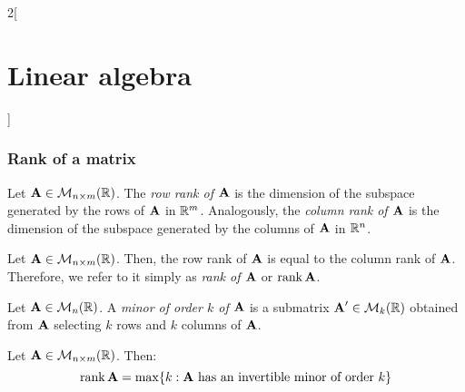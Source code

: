 \documentclass[../../../main.tex]{subfiles}
\begin{document}
\begin{multicols}{2}[\section{Linear algebra}]
    \subsubsection*{Rank of a matrix}
    \begin{definition}
        Let $\boldsymbol{\mathrm{A}}\in\mathcal{M}_{n\times m}(\mathbb{R})$. The \textit{row rank of $\boldsymbol{\mathrm{A}}$} is the dimension of the subspace generated by the rows of $\boldsymbol{\mathrm{A}}$ in $\mathbb{R}^m$. Analogously, the \textit{column rank of $\boldsymbol{\mathrm{A}}$} is the dimension of the subspace generated by the columns of $\boldsymbol{\mathrm{A}}$ in $\mathbb{R}^n$.
    \end{definition}
    \begin{prop}
        Let $\boldsymbol{\mathrm{A}}\in\mathcal{M}_{n\times m}(\mathbb{R})$. Then, the row rank of $\boldsymbol{\mathrm{A}}$ is equal to the column rank of $\boldsymbol{\mathrm{A}}$. Therefore, we refer to it simply as \textit{rank of $\boldsymbol{\mathrm{A}}$} or $\rank\boldsymbol{\mathrm{A}}$.
    \end{prop}
    \begin{definition}
        Let $\boldsymbol{\mathrm{A}}\in\mathcal{M}_n(\mathbb{R})$. A \textit{minor of order $k$ of $\boldsymbol{\mathrm{A}}$} is a submatrix $\boldsymbol{\mathrm{A}}'\in\mathcal{M}_k(\mathbb{R})$ obtained from $\boldsymbol{\mathrm{A}}$ selecting $k$ rows and $k$ columns of $\boldsymbol{\mathrm{A}}$.
    \end{definition}
    \begin{prop}
        Let $\boldsymbol{\mathrm{A}}\in\mathcal{M}_{n\times m}(\mathbb{R})$. Then:
        $$\rank\vectorfunction{A}=\max\{k:\text{$\vectorfunction{A}$\ has an invertible minor of order $k$}\}$$
    \end{prop}

\end{multicols}
\end{document}
